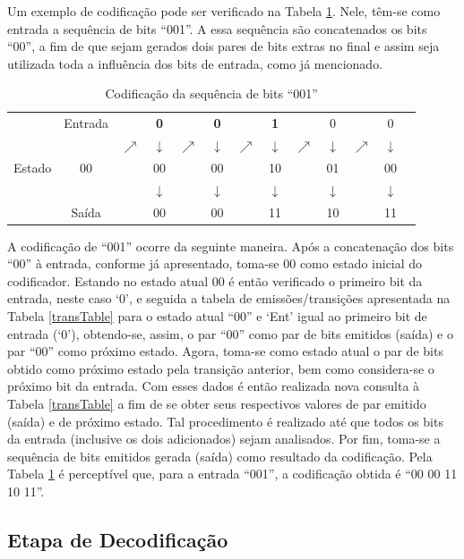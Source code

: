 \documentclass[12pt]{article}
\begin{document}
Um exemplo de codificação pode ser verificado na Tabela \ref{encode}. Nele, têm-se como entrada a sequência de bits ``001''. A essa sequência são concatenados os bits ``00'', a fim de que sejam gerados dois pares de bits extras no final e assim seja utilizada toda a influência dos bits de entrada, como já mencionado.

\begin{table}[!ht]
\centering
\caption{Codificação da sequência de bits ``001''}
\label{encode}
\def\arraystretch{1.2}
\begin{tabular}{ccccccccccccc}
       & Entrada & & \textbf{0} & & \textbf{0} & & \textbf{1} & & 0 & & 0\\
       & & $\nearrow$ & $\downarrow$ & $\nearrow$ & $\downarrow$ & $\nearrow$ & $\downarrow$ & $\nearrow$ & $\downarrow$ & $\nearrow$ & $\downarrow$\\
Estado & 00 &  & 00 &  & 00 &  & 10 &  & 01 &  & 00\\
       & & & $\downarrow$ & & $\downarrow$ & & $\downarrow$ & & $\downarrow$ & & $\downarrow$\\
       & Saída & & 00 & & 00 & & 11 & & 10 & & 11\\
\end{tabular}
\end{table}

A codificação de ``001'' ocorre da seguinte maneira. Após a concatenação dos bits ``00'' à entrada, conforme já apresentado, toma-se 00 como estado inicial do codificador. Estando no estado atual 00 é então verificado o primeiro bit da entrada, neste caso `0', e seguida a tabela de emissões/transições apresentada na Tabela \ref{transTable} para o estado atual ``00'' e `Ent' igual ao primeiro bit de entrada (`0'), obtendo-se, assim, o par ``00'' como par de bits emitidos (saída) e o par ``00'' como próximo estado. Agora, toma-se como estado atual o par de bits obtido como próximo estado pela transição anterior, bem como considera-se o próximo bit da entrada. Com esses dados é então realizada nova consulta à Tabela \ref{transTable} a fim de se obter seus respectivos valores de par emitido (saída) e de próximo estado.  Tal procedimento é realizado até que todos os bits da entrada (inclusive os dois adicionados) sejam analisados. Por fim, toma-se a sequência de bits emitidos gerada (saída) como resultado da codificação. Pela Tabela \ref{encode} é perceptível que, para a entrada ``001'', a codificação obtida é ``00 00 11 10 11''.

\subsection{Etapa de Decodificação}
\end{document}
